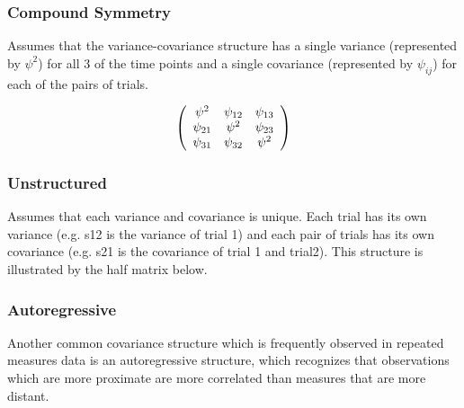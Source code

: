 \documentclass[12pt, a4paper]{report}
\theoremstyle{plain}
\theoremstyle{definition}
\theoremstyle{remark}
\begin{document}
	
	\subsubsection*{Compound Symmetry}
	
	Assumes that the variance-covariance structure has a single variance (represented by $\psi^2$)
	for all 3 of the time points and a single covariance (represented by $\psi_{ij}$) for each of the pairs of trials.
	
	\[
	\left(%
	\begin{array}{c c c}
	\psi^2 &  \psi_{12} & \psi_{13}   \\
	\psi_{21} & \psi^2 & \psi_{23}   \\
	\psi_{31} & \psi_{32} & \psi^2   \\
	\end{array}%
	\right)
	\]
	
	
	
	
	\subsubsection{Unstructured}
	
	Assumes that each variance and covariance is unique.
	Each trial has its own variance (e.g. s12 is the variance of trial 1)
	and each pair of trials has its own covariance (e.g. s21 is the covariance of trial 1 and trial2).
	This structure is illustrated by the half matrix below.
	
	\subsubsection{Autoregressive}
	
	Another common covariance structure which is frequently observed
	in repeated measures data is an autoregressive structure,
	which recognizes that observations which are more proximate
	are more correlated than measures that are more distant.
	
	
	
	
\end{document}
